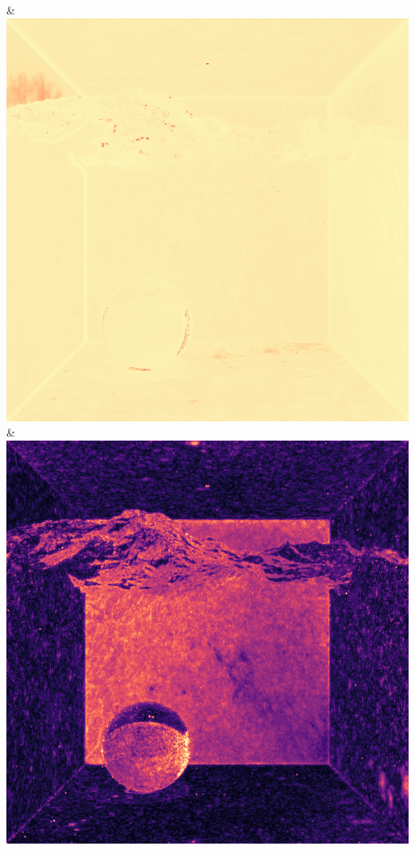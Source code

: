 & \includegraphics[width=\linewidth]{figures/py/tests/quality_comparison/nrc+lt+bal_1spp_caustics_small_flip.png}
& \includegraphics[width=\linewidth]{figures/py/tests/quality_comparison/nrc+sppc_1spp_caustics_small_flip.png}
